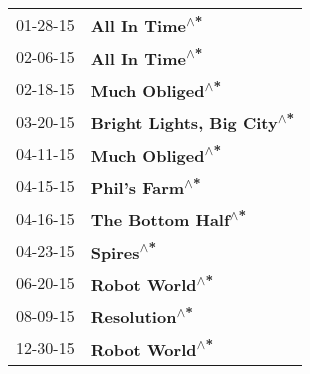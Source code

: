 \begin{supertabular}{p{0.25\columnwidth}p{0.75\columnwidth}}
 01-28-15 &              \textbf{All In Time\textsuperscript{$\wedge$*}} \\
 02-06-15 &              \textbf{All In Time\textsuperscript{$\wedge$*}} \\
 02-18-15 &             \textbf{Much Obliged\textsuperscript{$\wedge$*}} \\
 03-20-15 &  \textbf{Bright Lights, Big City\textsuperscript{$\wedge$*}} \\
 04-11-15 &             \textbf{Much Obliged\textsuperscript{$\wedge$*}} \\
 04-15-15 &              \textbf{Phil's Farm\textsuperscript{$\wedge$*}} \\
 04-16-15 &          \textbf{The Bottom Half\textsuperscript{$\wedge$*}} \\
 04-23-15 &                   \textbf{Spires\textsuperscript{$\wedge$*}} \\
 06-20-15 &              \textbf{Robot World\textsuperscript{$\wedge$*}} \\
 08-09-15 &               \textbf{Resolution\textsuperscript{$\wedge$*}} \\
 12-30-15 &              \textbf{Robot World\textsuperscript{$\wedge$*}} \\
\end{supertabular}
